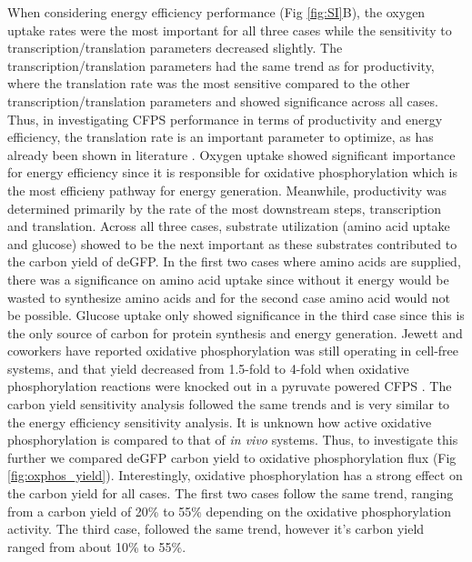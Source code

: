 \documentclass[journal=asbcd6,manuscript=article]{achemso}
\begin{document}
When considering energy efficiency performance (Fig \ref{fig:SI}B), the oxygen uptake rates were the most important for all three cases while the sensitivity to transcription/translation parameters decreased slightly.
The transcription/translation parameters had the same trend as for productivity, where the translation rate was the most sensitive compared to the other transcription/translation parameters and showed significance across all cases.
Thus, in investigating CFPS performance in terms of productivity and energy efficiency, the translation rate is an important parameter to optimize, as has already been shown in literature \cite{2005_underwood_biotech, 2014_li_PlosOne}.
Oxygen uptake showed significant importance for energy efficiency since it is responsible for oxidative phosphorylation which is the most efficieny pathway for energy generation.
Meanwhile, productivity was determined primarily by the rate of the most downstream steps, transcription and translation.
Across all three cases, substrate utilization (amino acid uptake and glucose) showed to be the next important as these substrates contributed to the carbon yield of deGFP.
In the first two cases where amino acids are supplied, there was a significance on amino acid uptake since without it energy would be wasted to synthesize amino acids and for the second case amino acid would not be possible. 
Glucose uptake only showed significance in the third case since this is the only source of carbon for protein synthesis and energy generation.
Jewett and coworkers have reported oxidative phosphorylation was still operating in cell-free systems, and that yield decreased from 1.5-fold to 4-fold when oxidative phosphorylation reactions were knocked out in a pyruvate powered CFPS \cite{Jewett:2008aa}.
The carbon yield sensitivity analysis followed the same trends and is very similar to the energy efficiency sensitivity analysis. 
It is unknown how active oxidative phosphorylation is compared to that of \textit{in vivo} systems.
Thus, to investigate this further we compared deGFP carbon yield to oxidative phosphorylation flux (Fig \ref{fig:oxphos_yield}).
Interestingly, oxidative phosphorylation has a strong effect on the carbon yield for all cases. 
The first two cases follow the same trend, ranging from a carbon yield of 20\% to 55\% depending on the oxidative phosphorylation activity.
The third case, followed the same trend, however it's carbon yield ranged from about 10\% to 55\%.  
\end{document}
